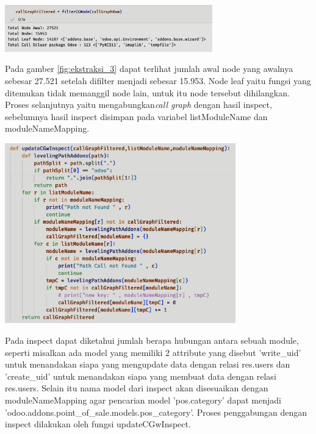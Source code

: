\begin{center}
	\includegraphics[width=9cm]{img/bab_4/ekstraksi_3.png}
	\label{fig:ekstraksi_3}
\end{center}

Pada gamber \ref{fig:ekstraksi_3} dapat terlihat jumlah awal node yang awalnya sebesar 27.521 setelah difilter menjadi sebesar 15.953. Node leaf yaitu fungsi yang ditemukan tidak memanggil node lain, untuk itu node tersebut dihilangkan. Proses selanjutnya yaitu mengabungkan\textit{call graph} dengan hasil inspect, sebelumnya hasil inspect disimpan pada variabel listModuleName dan moduleNameMapping. 

\begin{center}
	\includegraphics[width=10cm]{img/bab_4/ekstraksi_4.png}
	\label{fig:ekstraksi_4}
\end{center}

Pada inspect dapat diketahui jumlah berapa hubungan antara sebuah module, seperti misalkan ada model yang memiliki 2 attribute yang disebut 'write{\_}uid' untuk menandakan siapa  yang mengupdate data dengan relasi res.users dan 'create{\_}uid' untuk menandakan siapa  yang membuat data dengan relasi res.users. Selain itu nama model dari inspect akan disesuaikan dengan moduleNameMapping agar pencarian model 'pos.category' dapat menjadi 'odoo.addons.point{\_}of{\_}sale.models.pos{\_}category'. Proses penggabungan dengan inspect dilakukan oleh fungsi updateCGwInspect.

